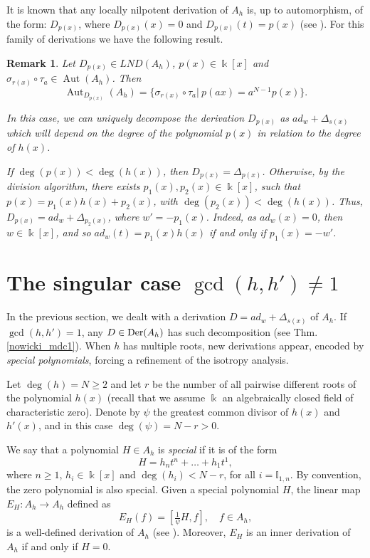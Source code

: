 \documentclass{article}
\numberwithin{equation}{section}\theoremstyle{plain}
\newtheorem{remark}[theorem]{Remark}
\newcommand{\der}{{\rm Der}}
\newcommand\I{\mathbb I}
\DeclareMathOperator{\Aut}{Aut}
\begin{document}
It is known that any locally nilpotent derivation of $A_h$ is, up to automorphism, of the form: $D_{p(x)}$, where $D_{p(x)}(x)=0$ and $D_{p(x)}(t)=p(x)$ (see \cite[Prop. 2]{ISF2021}). For this family of derivations we have the following result.


\begin{remark} Let $D_{p(x)}\in LND(A_h)$, $p(x)\in \Bbbk[x]$ and $\sigma_{r(x)} \circ \tau_a \in \Aut(A_h)$.
Then
    $$\Aut_{D_{p(x)}}(A_h) =\{\sigma_{r(x)}\circ\tau_{a} | \ p(ax)=a^{N-1}p(x)\}.$$

   In this case, we can uniquely decompose the derivation $D_{p(x)}$ as $ad_w+\Delta_{s(x)}$ which will depend on the degree of the polynomial $p(x)$ in relation to the degree of $h(x)$. 

If $\deg(p(x))<\deg(h(x))$, then $D_{p(x)}=\Delta_{p(x)}$. Otherwise, by the division algorithm,  there exists $p_1(x), p_2(x)\in \Bbbk[x]$, such that $p(x)=p_1(x)h(x)+p_2(x)$, with $\deg(p_2(x))<\deg(h(x))$.
Thus, $D_{p(x)}=ad_w+\Delta_{p_2(x)}$, where $ w'=-p_1(x)$.
Indeed, as $ad_w(x)=0$, then $w\in \Bbbk[x]$, and so $ad_w(t)=p_1(x)h(x)$ if and only if $p_1(x)=-w'$.
\end{remark}

\section{The singular case $\gcd(h,h') \neq1$}\label{section5}

In the previous section, we dealt with a derivation $D=ad_w + \Delta_{s(x)}$ of $A_h$.
If $\gcd(h,h')=1$, any $D \in \der(A_h)$ has such decomposition \cite[Thm. 10.1]{Nowicki} (see Thm. \ref{nowicki_mdc1}).
When $h$ has multiple roots, new derivations appear, encoded by \emph{special polynomials}, forcing a refinement of the isotropy analysis.

\medbreak

Let $\deg(h)=N \geq 2$ and let $r$ be the number of all pairwise different roots of the polynomial $h(x)$ (recall that we assume $\Bbbk$ an algebraically closed field of characteristic zero). Denote by $\psi$ the greatest common divisor of $h(x)$ and $h'(x)$, and in this case $\deg (\psi) = N-r > 0$. 

We say that a polynomial $H \in A_h$ is \emph{special} if it is of the form 
$$ H=h_nt^n+\ldots+h_1t^1,$$
where $n \ge 1$, $h_i \in \Bbbk[x]$ and $\deg (h_i) < N-r$, for all $i= \I_{1,n}$.
By convention, the zero polynomial is also special.
Given a special polynomial $H$, the linear map $E_H: A_h \to A_h$ defined as
$$ E_H(f)=\left[ \tfrac{1}{\psi}H,f \right], \quad f\in A_h, $$
is a well-defined derivation of $A_h$ (see \cite[Prop. 2.1 and 8.2]{Nowicki}). 
Moreover, $E_H$ is an inner derivation of $A_h$ if and only if $H=0$.
\end{document}
